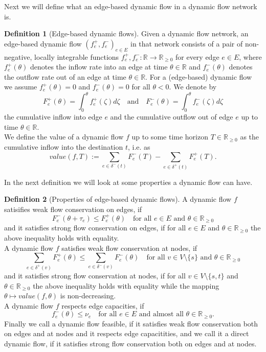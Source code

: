 \documentclass[reqno,openany]{amsbook}
\theoremstyle{definition}
\newtheorem{definition}{Definition}[chapter]
\theoremstyle{plain}
\begin{document}
Next we will define what an edge-based dynamic flow in a dynamic flow network is.

\begin{definition}[Edge-based dynamic flows]
Given a dynamic flow network, an edge-based dynamic flow $(f_e^+, f_e^-)_{e \in E}$ in that network consists of a pair of non-negative, locally integrable functions $f_e^+, f_e^-: \mathbb{R} \to \mathbb{R}_{\geq 0}$ for every edge $e \in E$, where $f_e^+(\theta)$ denotes the inflow rate into an edge at time $\theta \in \mathbb{R}$ and $f_e^-(\theta)$ denotes the outflow rate out of an edge at time $\theta \in \mathbb{R}$. For a (edge-based) dynamic flow we assume $f_e^+(\theta) = 0$ and $f_e^-(\theta) = 0$ for all $\theta < 0$. We denote by 
\[ F_e^+(\theta) = \int_0^{\theta} f_e^+(\zeta) d\zeta \quad \text{and} \quad F_e^-(\theta) = \int_0^{\theta} f_e^-(\zeta) d\zeta \]
the cumulative inflow into edge $e$ and the cumulative outflow out of edge $e$ up to time $\theta \in \mathbb{R}$. \\
We define the value of a dynamic flow $f$ up to some time horizon $T \in \mathbb{R}_{\geq 0}$ as the cumulative inflow into the destination $t$, i.e. as
\[value(f, T) := \sum_{e \in \delta^-(t)} F_e^-(T) - \sum_{e \in \delta^+(t)} F_e^+(T). \]
\end{definition}

\newpage

In the next definition we will look at some properties a dynamic flow can have.

\begin{definition}[Properties of edge-based dynamic flows]
A dynamic flow $f$ satisifies weak flow conservation on edges, if 
\[F_e^-(\theta + \tau_e) \leq F_e^+(\theta) \quad \text{for all $e \in E$ and $\theta \in \mathbb{R}_{\geq 0}$} \]
and it satisfies strong flow conservation on edges, if for all $e \in E$ and $\theta \in \mathbb{R}_{\geq 0}$ the above inequality holds with equality.\\
A dynamic flow $f$ satisfies weak flow conservation at nodes, if  
\[ \sum_{e \in \delta^+(v)} F_e^+(\theta) \leq \sum_{e \in \delta^-(v)} F_e^-(\theta) \quad \text{for all $v \in V\setminus\{s\}$ and $\theta \in \mathbb{R}_{\geq 0}$}\]
and it satisfies strong flow conservation at nodes, if for all $v \in V\setminus\{s, t\}$ and $\theta \in \mathbb{R}_{\geq 0}$ the above inequality holds with equality while  the mapping $\theta \mapsto value(f, \theta)$ is non-decreasing. \\
A dynamic flow $f$ respects edge capacities, if 
\[ f_e^-(\theta) \leq \nu_e \quad \text{for all $e \in E$ and almost all $\theta \in \mathbb{R}_{\geq 0}$.}\]
Finally we call a dynamic flow feasible, if it satisfies weak flow conservation both on edges and at nodes and it respects edge capacitities, and we call it a direct dynamic flow, if it satisfies strong flow conservation both on edges and at nodes.
\end{definition}
\end{document}

